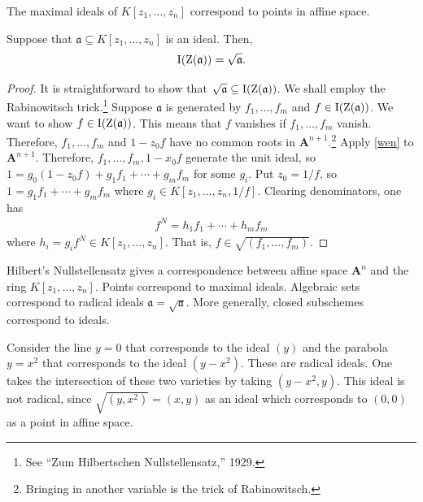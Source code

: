 \documentclass [11 pt, oneside] {article}
\begin{document}
\begin{theorem}\label{wen}\index{}
The maximal ideals of $K[z_1,\hdots, z_n]$ correspond to points in affine space.
\end{theorem}

\begin{theorem}\label{stn}\index{}
Suppose that $\mathfrak{a}\subseteq K[z_1,\hdots, z_n]$ is an ideal. Then, 
\begin{align*}
	\operatorname{I}(\operatorname{Z}(\mathfrak{a})) = \sqrt{\mathfrak{a}} .
\end{align*}
\end{theorem}

\begin{proof}
It is straightforward to show that $\sqrt{\mathfrak{a}} \subseteq \operatorname{I}(\operatorname{Z}(\mathfrak{a}))$. We shall employ the Rabinowitsch trick.\footnote{See ``Zum Hilbertschen Nullstellensatz,'' 1929.} Suppose $\mathfrak{a}$ is generated by $f_1,\hdots, f_m$ and $f\in \operatorname{I}(\operatorname{Z}(\mathfrak{a}))$. We want to show $f\in \operatorname{I}(\operatorname{Z}(\mathfrak{a}))$. This means that $f$ vanishes if $f_1,\hdots, f_m$ vanish. Therefore, $f_1,\hdots, f_m$ and $1-z_0f$ have no common roots in $\mathbf{A}^{n+1}$.\footnote{Bringing in another variable is the trick of Rabinowitsch.} Apply \cref{wen} to $\mathbf{A}^{n+1}$. Therefore, $f_1,\hdots, f_m, 1-x_0f$ generate the unit ideal, so $1 = g_0(1-z_0f)+g_1f_1 +\cdots + g_mf_m$ for some $g_i$. Put $z_0=1/f$, so $1=g_1f_1+\cdots +g_mf_m$ where $g_i \in K[z_1,\hdots, z_n, 1/f]$. Clearing denominators, one has
\begin{align*}
	f^N = h_1f_1+\cdots + h_mf_m
\end{align*}
where $h_i=g_if^N\in K[z_1,\hdots, z_n]$. That is, $f\in \sqrt{(f_1,\hdots, f_m)} $.
\end{proof}

Hilbert's Nullstellensatz gives a correspondence between affine space $\mathbf{A}^n$ and the ring $K[z_1,\hdots, z_n]$. Points correspond to maximal ideals. Algebraic sets correspond to radical ideals $\mathfrak{a} = \sqrt{\mathfrak{a}} $. More generally, closed subschemes correspond to ideals.

\begin{example}[ ]\label{}
Consider the line $y=0$ that corresponds to the ideal $(y)$ and the parabola $y=x^2$ that corresponds to the ideal $(y-x^2)$. These are radical ideals. One takes the intersection of these two varieties by taking $(y-x^2, y)$. This ideal is not radical, since $\sqrt{(y, x^2)}=(x,y)$ as an ideal which corresponds to $(0,0)$ as a point in affine space.
\end{example}
\end{document}
